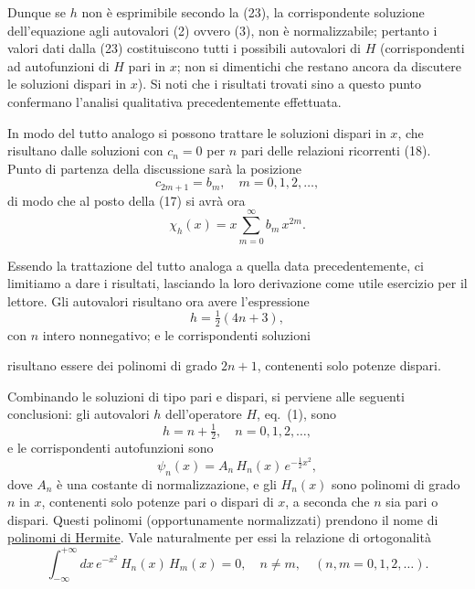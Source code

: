\documentclass[11pt, a4paper]{book}
\numberwithin{equation}{section}
\begin{document}
Dunque se $h$ non è esprimibile secondo la (23), la corrispondente
soluzione dell'equazione agli autovalori (2) ovvero (3), non è
normalizzabile; pertanto i valori dati dalla (23) costituiscono tutti i
possibili autovalori di $H$ (corrispondenti ad autofunzioni di $H$ pari in
$x$; non si dimentichi che restano ancora da discutere le soluzioni dispari
in $x$). Si noti che i risultati trovati sino a questo punto confermano
l'analisi qualitativa precedentemente effettuata.

In modo del tutto analogo si possono trattare le soluzioni dispari in
$x$, che risultano dalle soluzioni con $c_n = 0$ per $n$ pari delle
relazioni ricorrenti (18). Punto di partenza della discussione sarà la
posizione
\begin{equation}
c_{2m+1} = b_m, \quad m = 0, 1, 2, \ldots,
\end{equation}
di modo che al posto della (17) si avrà ora
\begin{equation}
\chi_h(x) = x\sum_{m=0}^{\infty} b_m\,x^{2m}.
\end{equation}

Essendo la trattazione del tutto analoga a quella data precedentemente,
ci limitiamo a dare i risultati, lasciando la loro derivazione come utile
esercizio per il lettore. Gli autovalori risultano ora avere l'espressione
\begin{equation}
h = \tfrac{1}{2}(4n+3),
\end{equation}
con $n$ intero nonnegativo; e le corrispondenti soluzioni


risultano essere dei polinomi di grado $2n+1$, contenenti solo potenze
dispari.

Combinando le soluzioni di tipo pari e dispari, si perviene alle
seguenti conclusioni: gli autovalori $h$ dell'operatore $H$, eq.\ (1),
sono
\begin{equation}
h = n + \tfrac{1}{2}, \quad n = 0, 1, 2, \ldots,
\end{equation}
e le corrispondenti autofunzioni sono
\begin{equation}
\psi_n(x) = A_n\,H_n(x)\,e^{-\frac{1}{2}x^2},
\end{equation}
dove $A_n$ è una costante di normalizzazione, e gli $H_n(x)$ sono polinomi
di grado $n$ in $x$, contenenti solo potenze pari o dispari di $x$, a
seconda che $n$ sia pari o dispari. Questi polinomi (opportunamente
normalizzati) prendono il nome di \uline{polinomi di Hermite}. Vale
naturalmente per essi la relazione di ortogonalità
\begin{equation}
\int_{-\infty}^{+\infty} dx\,e^{-x^2}\,H_n(x)\,H_m(x) = 0, \quad n \neq m,
\quad (n,m = 0,1,2,\ldots).
\end{equation}
\end{document}
